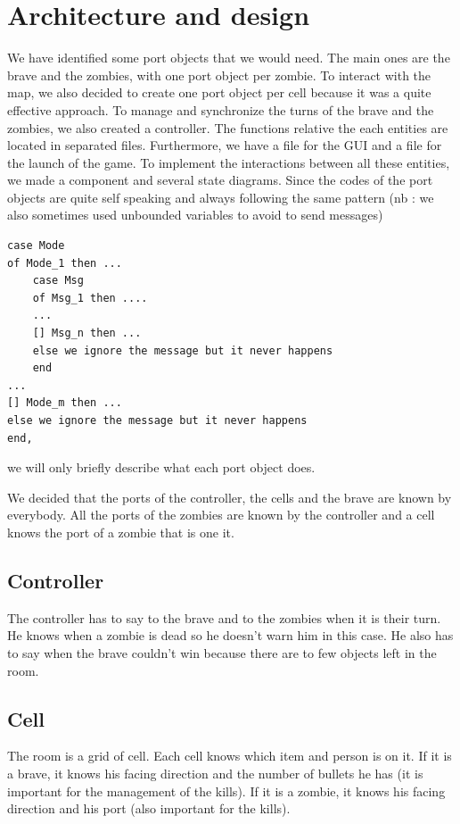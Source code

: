\documentclass[11pt,a4paper]{article}
\begin{document}
\section{Architecture and design}

We have identified some port objects that we would need. The main ones are the brave and the zombies, with one port object per zombie. To interact with the map, we also decided to create one port object per cell because it was a quite effective approach. To manage and synchronize the turns of the brave and the zombies, we also created a controller. The functions relative the each entities are located in separated files. Furthermore, we have a file for the GUI and a file for the launch of the game. To implement the interactions between all these entities, we made a component and several state diagrams. Since the codes of the port objects are quite self speaking and always following the same pattern (nb : we also sometimes used unbounded variables to avoid to send messages)
\begin{lstlisting}[basicstyle=\ttfamily\footnotesize]
case Mode
of Mode_1 then ...
	case Msg
	of Msg_1 then ....
	...
	[] Msg_n then ...
	else we ignore the message but it never happens
	end
...	
[] Mode_m then ...
else we ignore the message but it never happens
end,
\end{lstlisting}
we will only briefly describe what each port object does. 
	
We decided that the ports of the controller, the cells and the brave are known by everybody. All the ports of the zombies are known by the controller and a cell knows the port of a zombie that is one it.

\subsection{Controller}
The controller has to say to the brave and to the zombies when it is their turn. He knows when a zombie is dead so he doesn't warn him in this case.  He also has to say when the brave couldn't win because there are to few objects left in the room. 

\subsection{Cell}
The room is a grid of cell. Each cell knows which item and person is on it. If it is a brave, it knows his facing direction and the number of bullets he has (it is important for the management of the kills). If it is a zombie, it knows his facing direction and his port (also important for the kills).
\end{document}
